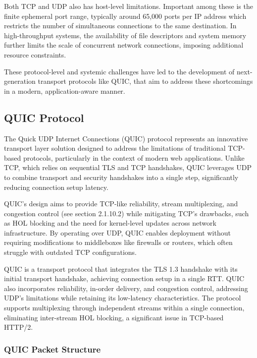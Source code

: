 Both TCP and UDP also has  host-level limitations. Important among these is the finite ephemeral port range, typically around 65,000 ports per IP address which restricts the number of simultaneous connections to the same destination. In high-throughput systems, the availability of file descriptors and system memory further limits the scale of concurrent network connections, imposing additional resource constraints.

These protocol-level and systemic challenges have led to the development of next-generation transport protocols like QUIC, that aim to address these shortcomings in a modern, application-aware manner.

\subsection{QUIC Protocol}

The Quick UDP Internet Connections (QUIC) protocol represents an innovative transport layer solution designed to address the limitations of traditional TCP-based protocols, particularly in the context of modern web applications. Unlike TCP, which relies on sequential TLS and TCP handshakes, QUIC leverages UDP to combine transport and security handshakes into a single step, significantly reducing connection setup latency.

QUIC’s design aims to provide TCP-like reliability, stream multiplexing, and congestion control (see section 2.1.10.2) while mitigating TCP’s drawbacks, such as HOL blocking and the need for kernel-level updates across network infrastructure. By operating over UDP, QUIC enables deployment without requiring modifications to middleboxes like firewalls or routers, which often struggle with outdated TCP configurations. 

QUIC is a transport protocol that integrates the TLS 1.3 handshake with its initial transport handshake, achieving connection setup in a single RTT. QUIC also incorporates reliability, in-order delivery, and congestion control, addressing UDP’s limitations while retaining its low-latency characteristics. The protocol supports multiplexing through independent streams within a single connection, eliminating inter-stream HOL blocking, a significant issue in TCP-based HTTP/2. 

\subsubsection{QUIC Packet Structure}

